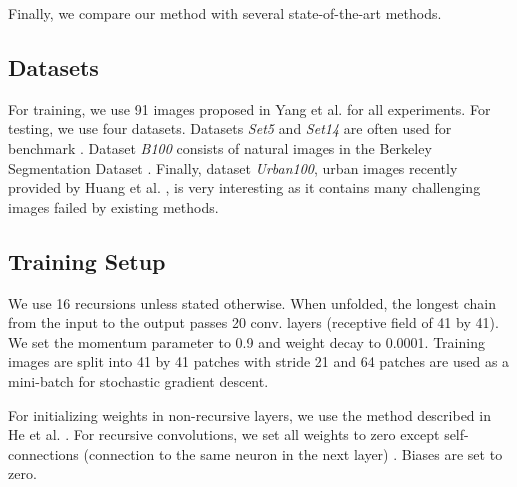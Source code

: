 \documentclass[10pt,twocolumn,letterpaper]{article}
\begin{document}
Finally, we compare our method with several state-of-the-art methods. 

\subsection{Datasets}
For training, we use 91 images proposed in Yang et al. \cite{yang2010image} for all experiments. For testing, we use four datasets. Datasets \textit{Set5} \cite{bevilacqua2012} and \textit{Set14} \cite{zeyde2012single} are often used for benchmark \cite{Timofte,Timofte2013,dong2014image}. Dataset \textit{B100}  consists of natural images in the Berkeley Segmentation Dataset \cite{Martin2001}. Finally, dataset \textit{Urban100}, urban images recently provided by Huang et al. \cite{Huang-CVPR-2015}, is very interesting as it contains many challenging images failed by existing methods.
\subsection{Training Setup}
%
%
%
%
%
%

We use 16 recursions unless stated otherwise. When unfolded, the longest chain from the input to the output passes 20 conv. layers (receptive field of 41 by 41). We set the momentum parameter to 0.9 and weight decay to 0.0001. Training images are split into 41 by 41 patches with stride 21 and 64 patches are used as a mini-batch for stochastic gradient descent. 

For initializing weights in non-recursive layers, we use the method described in He et al. \cite{he2015delving}. For recursive convolutions, we set all weights to zero except self-connections (connection to the same neuron in the next layer) \cite{socher2012semantic, le2015simple}.  Biases are set to zero.
\end{document}
